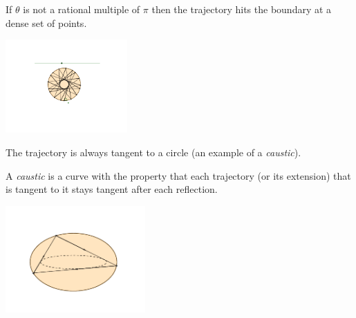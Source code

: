 \documentclass[compress,aspectratio=169,10pt,usenames,dvipsnames]{beamer}
\begin{document}

\begin{frame}

If $\theta$ is not a rational multiple of $\pi$ then the trajectory hits the boundary at a dense set of points.

\begin{center}
\includegraphics[width=0.35\textwidth]{CircleNPeriodic}
\end{center}

The trajectory is always tangent to a circle (an example of a \emph{caustic}).

\end{frame}


\begin{frame}

\vfill

\begin{definition}
A \emph{caustic} is a curve with the property that each trajectory (or its extension) that is tangent to it stays tangent after each reflection. 
\end{definition}

\vfill

\begin{center}
\includegraphics[width=0.4\textwidth]{Caustic}
\end{center}

\vfill


\end{frame}
\end{document}
